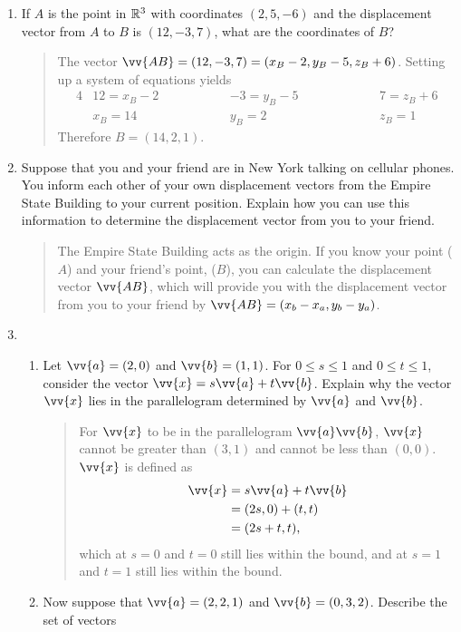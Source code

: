 \documentclass{hw}
\begin{document}
\begin{enumerate}
\vspace{3cm}
\item If $A$ is the point in $\mathbb{R}^{3}$ with coordinates $(2,5,-6)$ and the displacement
vector from $A$ to $B$ is $(12,-3,7)$, what are the coordinates of $B$?
\begin{quote}
The vector $\vv{AB} = (12,-3,7) = (x_{B} - 2, y_{B} - 5, z_{B} + 6)$. Setting up a system of
equations yields
\begin{alignat*}{4}
& 12 = x_{B} - 2\qquad\qquad && -3 = y_{B} - 5 \qquad\qquad &&& 7 = z_{B} + 6\\
& x_{B} = 14 && y_{B} = 2 &&& z_{B} = 1
\end{alignat*}
Therefore $B = (14,2,1)$.
\end{quote}
\newpage
\item Suppose that you and your friend are in New York talking on cellular phones. You inform each other
of your own displacement vectors from the Empire State Building to your current position. Explain how
you can use this information to determine the displacement vector from you to your friend.
\begin{quote}
The Empire State Building acts as the origin. If you know your point ($A$) and your friend's point, ($B$),
you can calculate the displacement vector $\vv{AB}$, which will provide you with the displacement vector
from you to your friend by $\vv{AB} = (x_{b} - x_{a}, y_{b} - y_{a})$.
\end{quote}
\item
\begin{enumerate}
\item Let $\vv{a} = (2,0)$ and $\vv{b} = (1,1)$. For $0\leq s\leq 1$ and $0\leq t\leq 1$, consider the
vector $\vv{x} = s\vv{a} + t\vv{b}$. Explain why the vector $\vv{x}$ lies in the parallelogram
determined by $\vv{a}$ and $\vv{b}$.
\begin{quote}
For $\vv{x}$ to be in the parallelogram $\vv{a}\vv{b}$, $\vv{x}$ cannot be greater than $(3,1)$ and
cannot be less than $(0,0)$. $\vv{x}$ is defined as
\begin{align*}
\vv{x} &= s\vv{a} + t\vv{b}\\
&= (2s,0) + (t,t)\\
&= (2s + t, t),
\end{align*}
which at $s = 0$ and $t = 0$ still lies within the bound, and at $s = 1$ and $t=1$ still lies within
the bound.
\end{quote}
\item Now suppose that $\vv{a} = (2,2,1)$ and $\vv{b} = (0,3,2)$. Describe the set of vectors

\end{enumerate}
\end{enumerate}
\end{document}
